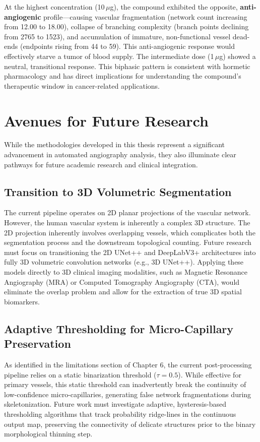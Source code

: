 At the highest concentration (10\,$\mu$g), the compound exhibited the opposite, \textbf{anti-angiogenic} profile---causing vascular fragmentation (network count increasing from 12.00 to 18.00), collapse of branching complexity (branch points declining from 2765 to 1523), and accumulation of immature, non-functional vessel dead-ends (endpoints rising from 44 to 59). This anti-angiogenic response would effectively starve a tumor of blood supply. The intermediate dose (1\,$\mu$g) showed a neutral, transitional response. This biphasic pattern is consistent with hormetic pharmacology and has direct implications for understanding the compound's therapeutic window in cancer-related applications.

\section{Avenues for Future Research}
While the methodologies developed in this thesis represent a significant advancement in automated angiography analysis, they also illuminate clear pathways for future academic research and clinical integration.

\subsection{Transition to 3D Volumetric Segmentation}
The current pipeline operates on 2D planar projections of the vascular network. However, the human vascular system is inherently a complex 3D structure. The 2D projection inherently involves overlapping vessels, which complicates both the segmentation process and the downstream topological counting. Future research must focus on transitioning the 2D UNet++ and DeepLabV3+ architectures into fully 3D volumetric convolution networks (e.g., 3D UNet++). Applying these models directly to 3D clinical imaging modalities, such as Magnetic Resonance Angiography (MRA) or Computed Tomography Angiography (CTA), would eliminate the overlap problem and allow for the extraction of true 3D spatial biomarkers.

\subsection{Adaptive Thresholding for Micro-Capillary Preservation}
As identified in the limitations section of Chapter 6, the current post-processing pipeline relies on a static binarization threshold ($\tau = 0.5$). While effective for primary vessels, this static threshold can inadvertently break the continuity of low-confidence micro-capillaries, generating false network fragmentations during skeletonization. Future work must investigate adaptive, hysteresis-based thresholding algorithms that track probability ridge-lines in the continuous output map, preserving the connectivity of delicate structures prior to the binary morphological thinning step.

